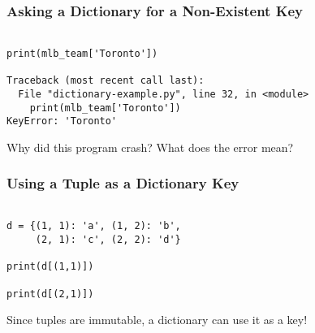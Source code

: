 \documentclass[14pt,aspectratio=169]{beamer}
\begin{document}
%
\begin{frame}[fragile]
  \frametitle{Asking a Dictionary for a Non-Existent Key}
  \begin{minipage}{6in}
    \vspace*{.25in}
    \begin{verbatim}

print(mlb_team['Toronto'])

Traceback (most recent call last):
  File "dictionary-example.py", line 32, in <module>
    print(mlb_team['Toronto'])
KeyError: 'Toronto'

    \end{verbatim}
  \end{minipage}
  \vspace*{.025in}
  \begin{center}
    \normalsize \noindent Why did this program crash? What does the error mean?\\
  \end{center}
\end{frame}

%
\begin{frame}[fragile]
  \frametitle{Using a Tuple as a Dictionary Key}
  \begin{minipage}{6in}
    \vspace*{.25in}
    \begin{verbatim}

d = {(1, 1): 'a', (1, 2): 'b',
     (2, 1): 'c', (2, 2): 'd'}

print(d[(1,1)])

print(d[(2,1)])

    \end{verbatim}
  \end{minipage}
  \vspace*{.025in}
  \begin{center}
    \normalsize \noindent Since tuples are immutable, a dictionary can use it as
    a key! \\
  \end{center}
\end{frame}
\end{document}

